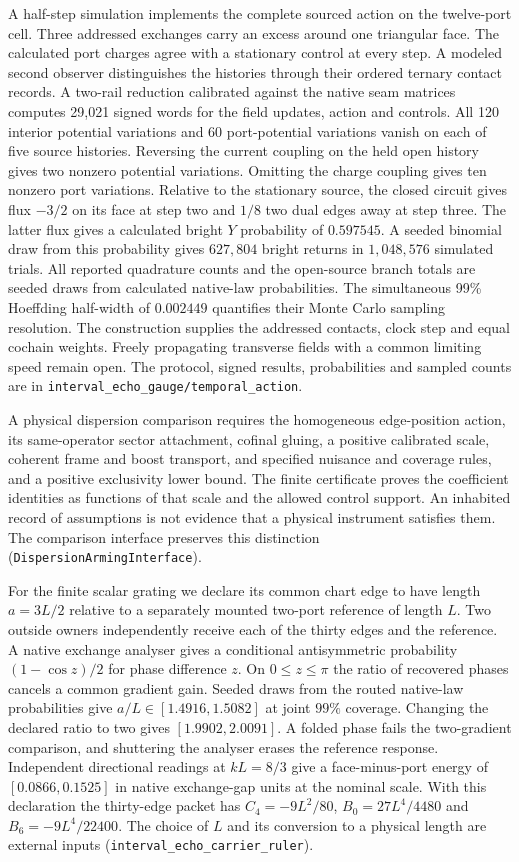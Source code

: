\documentclass[11pt]{article}
\theoremstyle{remark}
\theoremstyle{plain}
\begin{document}
A half-step simulation implements the complete sourced action on the
twelve-port cell. Three addressed exchanges carry an excess around one
triangular face. The calculated port charges agree with a stationary
control at every step. A modeled second observer distinguishes the
histories through their ordered ternary contact records. A two-rail
reduction calibrated against the native seam matrices computes 29,021
signed words for the field updates, action and controls. All 120 interior
potential variations and 60 port-potential variations vanish on each of
five source histories. Reversing the current coupling on the held open
history gives two nonzero potential variations. Omitting the charge
coupling gives ten nonzero port variations. Relative to the stationary
source, the closed circuit gives flux $-3/2$ on its face at step two and
$1/8$ two dual edges away at step three. The latter flux gives a calculated
bright $Y$ probability of $0.597545$. A seeded binomial draw from this
probability gives $627{,}804$ bright returns in $1{,}048{,}576$ simulated
trials. All reported quadrature counts and the open-source branch totals
are seeded draws from calculated native-law probabilities. The simultaneous
99\% Hoeffding half-width of $0.002449$ quantifies their Monte Carlo
sampling resolution. The construction supplies the addressed contacts,
clock step and equal cochain weights. Freely propagating transverse fields
with a common limiting speed remain open. The protocol, signed results,
probabilities and sampled counts are in
\texttt{interval\_echo\_gauge/temporal\_action}.

A physical dispersion comparison requires the homogeneous edge-position
 action, its same-operator sector attachment, cofinal gluing, a positive
 calibrated scale, coherent frame and boost transport, and specified
 nuisance and coverage rules, and a positive exclusivity lower bound.
The finite certificate proves the coefficient
 identities as functions of that scale and the allowed control support.
 An inhabited record of assumptions is not evidence that a physical
 instrument satisfies them. The comparison interface preserves this
 distinction (\texttt{DispersionArmingInterface}).

For the finite scalar grating we declare its common chart edge to have
length $a=3L/2$ relative to a separately mounted two-port reference of
length $L$. Two outside owners independently receive each of the thirty
edges and the reference. A native exchange analyser gives a conditional
antisymmetric probability $(1-\cos z)/2$ for phase difference $z$.
On $0\le z\le\pi$ the ratio of recovered phases cancels a common gradient
gain. Seeded draws from the routed native-law probabilities give
$a/L\in[1.4916,1.5082]$ at joint $99\%$ coverage. Changing the
declared ratio to two gives $[1.9902,2.0091]$. A folded phase fails
the two-gradient comparison, and shuttering the analyser erases the
reference response. Independent directional readings at $kL=8/3$ give
a face-minus-port energy of $[0.0866,0.1525]$ in native exchange-gap
units at the nominal scale. With this declaration the thirty-edge packet
has $C_4=-9L^2/80$, $B_0=27L^4/4480$ and $B_6=-9L^4/22400$.
The choice of $L$ and its conversion to a physical length are external
inputs (\texttt{interval\_echo\_carrier\_ruler}).
\end{document}
